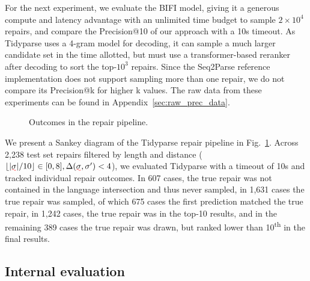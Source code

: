 \documentclass[sigplan,acmsmall,nonacm,screen]{acmart}\settopmatter{printfolios=false,printccs=false,printacmref=false}
\begin{document}
For the next experiment, we evaluate the BIFI model, giving it a generous compute and latency advantage with an unlimited time budget to sample $2\times10^4$ repairs, and compare the Precision@10 of our approach with a 10s timeout. As Tidyparse uses a 4-gram model for decoding, it can sample a much larger candidate set in the time allotted, but must use a transformer-based reranker after decoding to sort the top-$10^3$ repairs. Since the Seq2Parse reference implementation does not support sampling more than one repair, we do not compare its Precision@k for higher k values. The raw data from these experiments can be found in Appendix~\ref{sec:raw_prec_data}.

\begin{figure}
\vspace{-1.13cm}
\begin{center}\resizebox{.43\textwidth}{!}{\hspace{-0.6cm}}\end{center}
\vspace{-1.1cm}
\caption{Outcomes in the repair pipeline.}
\label{fig:sankey}
\end{figure}

\noindent We present a Sankey diagram of the Tidyparse repair pipeline in Fig.~\ref{fig:sankey}. Across 2,238 test set repairs filtered by length and distance ($\lfloor|\err\sigma| / 10\rfloor \in [0, 8], \Delta(\err\sigma, \sigma') < 4$), we evaluated Tidyparse with a timeout of 10s and tracked individual repair outcomes. In 607 cases, the true repair was not contained in the language intersection and thus never sampled, in 1,631 cases the true repair was sampled, of which 675 cases the first prediction matched the true repair, in 1,242 cases, the true repair was in the top-10 results, and in the remaining 389 cases the true repair was drawn, but ranked lower than 10\textsuperscript{th} in the final results.

\clearpage\subsection{Internal evaluation}\label{sec:rq3}
\end{document}
